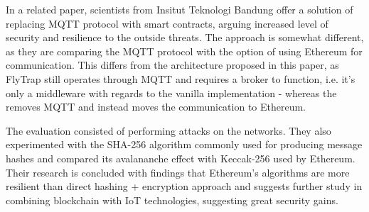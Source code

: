 In a related paper, scientists from Insitut Teknologi Bandung \citep{fakhri2018secure} offer a solution of replacing MQTT protocol with smart contracts, arguing increased level of security and resilience to the outside threats. The approach is somewhat different, as they are comparing the MQTT protocol with the option of using Ethereum for communication. This differs from the architecture proposed in this paper, as FlyTrap still operates through MQTT and requires a broker to function, i.e. it's only a middleware with regards to the vanilla implementation - whereas the \citet{fakhri2018secure} removes MQTT and instead moves the communication to Ethereum.

The evaluation consisted of performing attacks on the networks. They also experimented with the SHA-256 \cite{gilbert2003security} algorithm commonly used for producing message hashes and compared its avalananche effect with Keccak-256 used by Ethereum. Their research is concluded with findings that Ethereum's algorithms are more resilient than direct hashing + encryption approach and suggests further study in combining blockchain with IoT technologies, suggesting great security gains.
